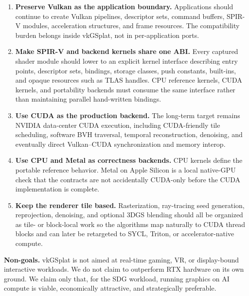 \documentclass[10pt,journal,onecolumn]{IEEEtran}
\begin{document}
\begin{enumerate}
    \item \textbf{Preserve Vulkan as the application boundary.}
    Applications should continue to create Vulkan pipelines, descriptor
    sets, command buffers, SPIR-V modules, acceleration structures, and
    frame resources. The compatibility burden belongs inside vkGSplat,
    not in per-application ports.

    \item \textbf{Make SPIR-V and backend kernels share one ABI.}
    Every captured shader module should lower to an explicit kernel
    interface describing entry points, descriptor sets, bindings,
    storage classes, push constants, built-ins, and opaque resources
    such as TLAS handles. CPU reference kernels, CUDA kernels, and
    portability backends must consume the same interface rather than
    maintaining parallel hand-written bindings.

    \item \textbf{Use CUDA as the production backend.} The long-term
    target remains NVIDIA data-center CUDA execution, including
    CUDA-friendly tile scheduling, software BVH traversal, temporal
    reconstruction, denoising, and eventually direct Vulkan--CUDA
    synchronization and memory interop.

    \item \textbf{Use CPU and Metal as correctness backends.} CPU
    kernels define the portable reference behavior. Metal on Apple
    Silicon is a local native-GPU check that the contracts are not
    accidentally CUDA-only before the CUDA implementation is complete.

    \item \textbf{Keep the renderer tile based.} Rasterization,
    ray-tracing seed generation, reprojection, denoising, and optional
    3DGS blending should all be organized as tile- or block-local work
    so the algorithms map naturally to CUDA thread blocks and can later
    be retargeted to SYCL, Triton, or accelerator-native compute.
\end{enumerate}

\textbf{Non-goals.} vkGSplat is not aimed at real-time gaming, VR, or
display-bound interactive workloads. We do not claim to outperform RTX
hardware on its own ground. We claim only that, for the SDG workload,
running graphics on AI compute is viable, economically attractive, and
strategically preferable.
\end{document}
